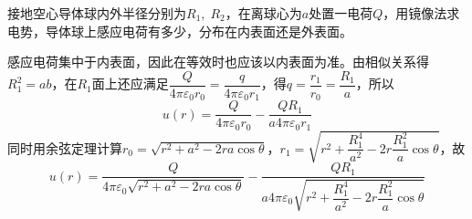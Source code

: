 \documentclass{mynote}
\begin{document}
\begin{exercise}{2.9}
    接地空心导体球内外半径分别为$R_1,\; R_2$，在离球心为$a$处置一电荷$Q$，用镜像法求电势，导体球上感应电荷有多少，分布在内表面还是外表面。
\end{exercise}
\begin{solution}
    感应电荷集中于内表面，因此在等效时也应该以内表面为准。由相似关系得$R_1^2 = ab$，在$R_1$面上还应满足$\dfrac{Q}{4\pi \varepsilon_0 r_0} = \dfrac{q}{4\pi \varepsilon_0 r_1}$，得$q = \dfrac{r_1}{r_0} = \dfrac{R_1}{a}$，所以
    \[
    u(r) = \dfrac{Q}{4\pi \varepsilon_0 r_0} - \dfrac{QR_1}{a 4 \pi \varepsilon_0 r_1}
    \]
    同时用余弦定理计算$r_0 = \sqrt{r^2 + a^2 - 2ra\cos \theta}$，$r_1 = \sqrt{r^2 + \dfrac{R_1^4}{a^2} - 2r\dfrac{R_1^2}{a} \cos \theta}$，故
    \[
    u(r) = \dfrac{Q}{4\pi \varepsilon_0 \sqrt{r^2 + a^2 - 2ra\cos \theta}} - \dfrac{QR_1}{a 4 \pi \varepsilon_0 \sqrt{r^2 + \dfrac{R_1^4}{a^2} - 2r\dfrac{R_1^2}{a} \cos \theta}}
    \]
\end{solution}
\end{document}
